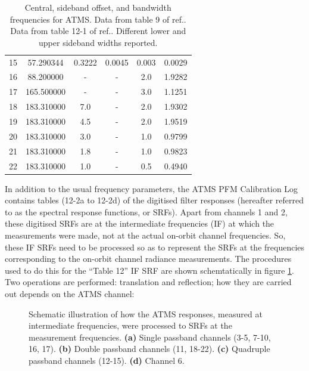 \begin{table}[htp]
\begin{tabular}{c c c c c c}
           15        &  57.290344  & 0.3222 & 0.0045 & 0.003  & 0.0029        \\
           16        &  88.200000  & -      & -      & 2.0    & 1.9282        \\
           17        & 165.500000  & -      & -      & 3.0    & 1.1251        \\
           18        & 183.310000  & 7.0    & -      & 2.0    & 1.9302        \\
           19        & 183.310000  & 4.5    & -      & 2.0    & 1.9519        \\
           20        & 183.310000  & 3.0    & -      & 1.0    & 0.9799        \\
           21        & 183.310000  & 1.8    & -      & 1.0    & 0.9823        \\
           22        & 183.310000  & 1.0    & -      & 0.5    & 0.4940        \\
    \hline
  \end{tabular}
  \caption{Central, sideband offset, and bandwidth frequencies for ATMS. Data from table 9 of ref.\cite{CrIS_EDR_ATBD}. Data from table 12-1 of ref.\cite{ATMS_PFM_CalLog}. Different lower and upper sideband widths reported. }
  \label{tab:atms_fo_sb_and_df}
\end{table}

In addition to the usual frequency parameters, the ATMS PFM Calibration Log \cite{ATMS_PFM_CalLog} contains tables (12-2a to 12-2d) of the digitised filter responses (hereafter referred to as the spectral response functions, or SRFs). Apart from channels 1 and 2, these digitised SRFs are at the intermediate frequencies (IF) at which the measurements were made, not at the actual on-orbit channel frequencies. So, these IF SRFs need to be processed so as to represent the SRFs at the frequencies corresponding to the on-orbit channel radiance measurements. The procedures used to do this for the ``Table 12'' IF SRF are shown schemtatically in figure \ref{fig:r_and_s}. Two operations are performed: translation and reflection; how they are carried out depends on the ATMS channel:

\begin{figure}[htp]
  \centering
  
  \caption{Schematic illustration of how the ATMS responses, measured at intermediate frequencies, were processed to SRFs at the measurement frequencies. \textbf{(a)} Single passband channels (3-5, 7-10, 16, 17). \textbf{(b)} Double passband channels (11, 18-22). \textbf{(c)} Quadruple passband channels (12-15). \textbf{(d)} Channel 6.}
  \label{fig:r_and_s}
\end{figure}

